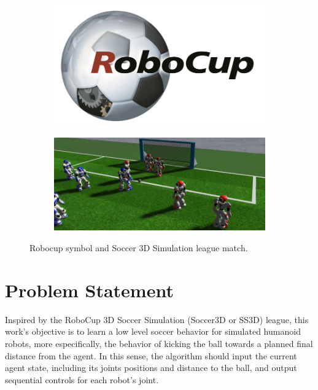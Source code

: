 \begin{figure}[ht]
  	\centering
  	\begin{subfigure}[b]{0.45\textwidth}
              \centering
	 		\includegraphics[height=0.13\textheight]{Chapter1/RoboCup.png}	
     \end{subfigure}
     
	 \begin{subfigure}[b]{0.45\textwidth}
              \centering
	 		\includegraphics[height=0.13\textheight]{Chapter1/SS3D.png}
	 \end{subfigure}
	     
	 \caption{Robocup symbol and Soccer 3D Simulation league match.}
	\label{fig:robocup}
\end{figure}

\section{Problem Statement}

Inspired by the RoboCup 3D Soccer Simulation (Soccer3D or SS3D) league, this work's objective is to learn a low level soccer behavior for simulated humanoid robots, more especifically, the behavior of kicking the ball towards a planned final distance from the agent. In this sense, the algorithm should input the current agent state, including its joints positions and distance to the ball, and output sequential controls for each robot's joint.

